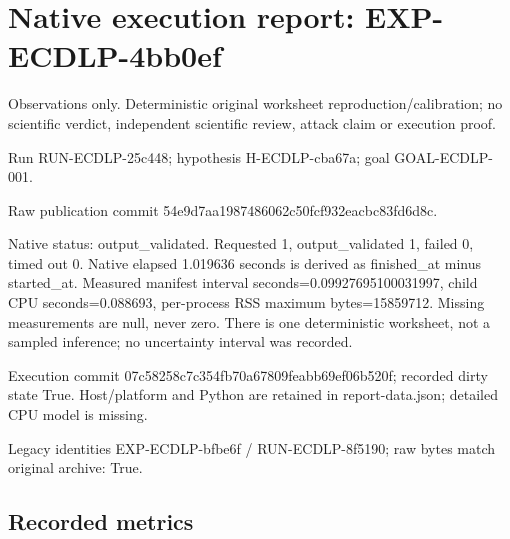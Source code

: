 \documentclass[10pt]{article}
\begin{document}
\section*{Native execution report: EXP-ECDLP-4bb0ef}
\noindent Observations only. Deterministic original worksheet reproduction/calibration; no scientific verdict, independent scientific review, attack claim or execution proof.\par\medskip
\noindent Run RUN-ECDLP-25c448; hypothesis H-ECDLP-cba67a; goal GOAL-ECDLP-001.\par
\noindent Raw publication commit 54e9d7aa1987486062c50fcf932eacbc83fd6d8c.\par\medskip
Native status: output\_validated. Requested 1, output\_validated 1, failed 0, timed out 0. Native elapsed 1.019636 seconds is derived as finished\_at minus started\_at. Measured manifest interval seconds=0.09927695100031997, child CPU seconds=0.088693, per-process RSS maximum bytes=15859712. Missing measurements are null, never zero. There is one deterministic worksheet, not a sampled inference; no uncertainty interval was recorded.\par\medskip
Execution commit 07c58258c7c354fb70a67809feabb69ef06b520f; recorded dirty state True. Host/platform and Python are retained in report-data.json; detailed CPU model is missing.\par\medskip
Legacy identities EXP-ECDLP-bfbe6f / RUN-ECDLP-8f5190; raw bytes match original archive: True.
\subsection*{Recorded metrics}

\end{document}
